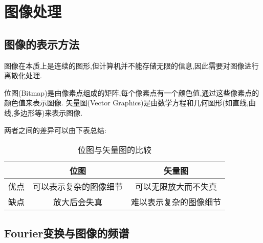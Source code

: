 \documentclass{ctexart}
\begin{document}
\section{图像处理}
\subsection{图像的表示方法}
图像在本质上是连续的图形,但计算机并不能存储无限的信息,因此需要对图像进行离散化处理.
\begin{definition}[位图与矢量图]
    位图(Bitmap)是由像素点组成的矩阵,每个像素点有一个颜色值,通过这些像素点的颜色值来表示图像.
    矢量图(Vector Graphics)是由数学方程和几何图形(如直线,曲线,多边形等)来表示图像.
\end{definition}
两者之间的差异可以由下表总结:
\begin{table}[h]
    \centering
    \begin{tabular}{ccc}
        \hline
        & 位图 & 矢量图 \\
        \hline
        优点 & 可以表示复杂的图像细节 & 可以无限放大而不失真 \\
        \hline
        缺点 & 放大后会失真 & 难以表示复杂的图像细节 \\
        \hline
    \end{tabular}
    \caption{位图与矢量图的比较}
\end{table}
\subsection{Fourier变换与图像的频谱}
\end{document}
